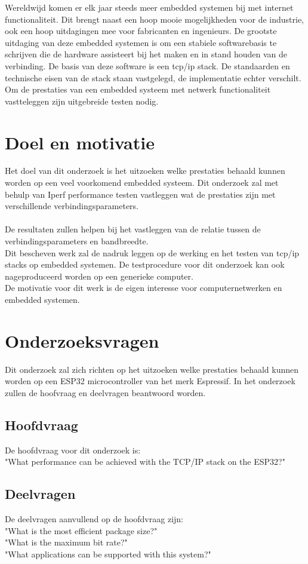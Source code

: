 \documentclass[../DCM2_Verslag.tex]{subfiles}
\begin{document}
Wereldwijd komen er elk jaar steeds meer embedded systemen bij met internet functionaliteit.
Dit brengt naast een hoop mooie mogelijkheden voor de industrie, ook een hoop uitdagingen mee voor fabricanten en ingenieurs. De grootste uitdaging van deze embedded systemen is om een stabiele softwarebasis te schrijven die de hardware assisteert bij het maken en in stand houden van de verbinding. De basis van deze software is een tcp/ip stack. De standaarden en technische eisen van de stack staan vastgelegd, de implementatie echter verschilt. Om de prestaties van een embedded systeem met netwerk functionaliteit vastteleggen zijn uitgebreide testen nodig. 

\section{Doel en motivatie}
Het doel van dit onderzoek is het uitzoeken welke prestaties behaald kunnen worden op een veel voorkomend embedded systeem. Dit onderzoek zal met behulp van Iperf performance testen vastleggen wat de prestaties zijn met verschillende verbindingsparameters.\\\\De resultaten zullen helpen bij het vastleggen van de relatie tussen de verbindingsparameters en bandbreedte. \\Dit bescheven werk zal de nadruk leggen op de werking en het testen van tcp/ip stacks op embedded systemen. De testprocedure voor dit onderzoek kan ook nageproduceerd worden op een generieke computer.\\
De motivatie voor dit werk is de eigen interesse voor computernetwerken en embedded systemen.
\clearpage
\section{Onderzoeksvragen}
Dit onderzoek zal zich richten op het uitzoeken welke prestaties behaald kunnen worden op een ESP32 microcontroller van het merk Espressif. In het onderzoek zullen de hoofvraag en deelvragen beantwoord worden. 

\subsection{Hoofdvraag}
De hoofdvraag voor dit onderzoek is:\\
"What performance can be achieved with the TCP/IP stack on the ESP32?"

\subsection{Deelvragen}
De deelvragen aanvullend op de hoofdvraag zijn:\\
"What is the most efficient package size?"\\
"What is the maximum bit rate?"\\
"What applications can be supported with this system?"\\
\end{document}
